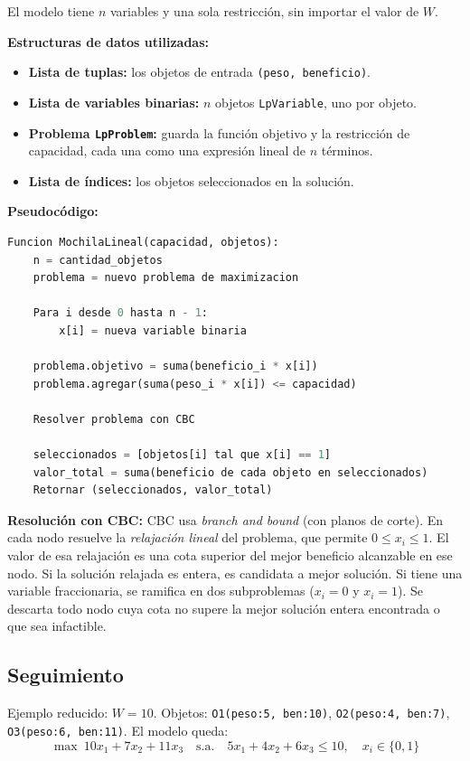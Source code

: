 \documentclass[11pt,a4paper]{article}
\begin{document}
El modelo tiene $n$ variables y una sola restricción, sin importar el valor de $W$.

\textbf{Estructuras de datos utilizadas:}
\begin{itemize}
    \item \textbf{Lista de tuplas:} los objetos de entrada \texttt{(peso, beneficio)}.
    \item \textbf{Lista de variables binarias:} $n$ objetos \texttt{LpVariable}, uno por objeto.
    \item \textbf{Problema \texttt{LpProblem}:} guarda la función objetivo y la restricción de capacidad, cada una como una expresión lineal de $n$ términos.
    \item \textbf{Lista de índices:} los objetos seleccionados en la solución.
\end{itemize}

\textbf{Pseudocódigo:}
\begin{lstlisting}[language=Python]
Funcion MochilaLineal(capacidad, objetos):
    n = cantidad_objetos
    problema = nuevo problema de maximizacion

    Para i desde 0 hasta n - 1:
        x[i] = nueva variable binaria

    problema.objetivo = suma(beneficio_i * x[i])
    problema.agregar(suma(peso_i * x[i]) <= capacidad)

    Resolver problema con CBC

    seleccionados = [objetos[i] tal que x[i] == 1]
    valor_total = suma(beneficio de cada objeto en seleccionados)
    Retornar (seleccionados, valor_total)
\end{lstlisting}

\textbf{Resolución con CBC:} CBC usa \textit{branch and bound} (con planos de corte). En cada nodo resuelve la \textit{relajación lineal} del problema, que permite $0 \le x_i \le 1$. El valor de esa relajación es una cota superior del mejor beneficio alcanzable en ese nodo. Si la solución relajada es entera, es candidata a mejor solución. Si tiene una variable fraccionaria, se ramifica en dos subproblemas ($x_i = 0$ y $x_i = 1$). Se descarta todo nodo cuya cota no supere la mejor solución entera encontrada o que sea infactible.

\subsection{Seguimiento}
Ejemplo reducido: $W = 10$. Objetos: \texttt{O1(peso:5, ben:10)}, \texttt{O2(peso:4, ben:7)}, \texttt{O3(peso:6, ben:11)}. El modelo queda:
\[
    \max\ 10x_1 + 7x_2 + 11x_3 \quad \text{s.a.} \quad 5x_1 + 4x_2 + 6x_3 \le 10, \quad x_i \in \{0,1\}
\]
\end{document}

